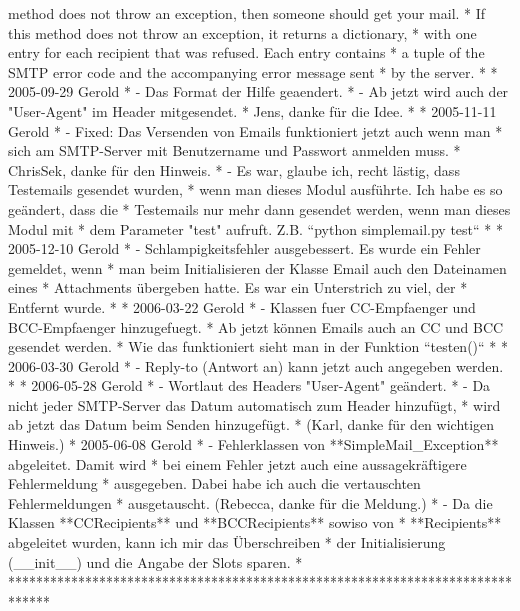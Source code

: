method does not throw an exception, then someone should get your mail. *
If this method does not throw an exception, it returns a dictionary, *     
with one entry for each recipient that was refused. Each entry contains *
a tuple of the SMTP error code and the accompanying error message sent *
by the server. * * 2005-09-29 Gerold *   - Das Format der Hilfe geaendert. 
*   - Ab jetzt wird auch der "User-Agent" im Header mitgesendet. *     
Jens, danke für die Idee. * * 2005-11-11 Gerold *   - Fixed: Das Versenden 
von Emails funktioniert jetzt auch wenn man *     sich am SMTP-Server mit 
Benutzername und Passwort anmelden muss. *     ChrisSek, danke für den 
Hinweis. *   - Es war, glaube ich, recht lästig, dass Testemails gesendet 
wurden, *     wenn man dieses Modul ausführte. Ich habe es so geändert, 
dass die *     Testemails nur mehr dann gesendet werden, wenn man dieses 
Modul mit *     dem Parameter "test" aufruft. Z.B. ``python simplemail.py 
test`` * * 2005-12-10 Gerold *   - Schlampigkeitsfehler ausgebessert. Es 
wurde ein Fehler gemeldet, wenn *     man beim Initialisieren der Klasse 
Email auch den Dateinamen eines *     Attachments übergeben hatte. Es war 
ein Unterstrich zu viel, der *     Entfernt wurde. * * 2006-03-22 Gerold *
- Klassen fuer CC-Empfaenger und BCC-Empfaenger hinzugefuegt. *     Ab 
jetzt können Emails auch an CC und BCC gesendet werden. *     Wie das 
funktioniert sieht man in der Funktion ``testen()`` * * 2006-03-30 Gerold *
- Reply-to (Antwort an) kann jetzt auch angegeben werden. * * 2006-05-28 
Gerold *   - Wortlaut des Headers "User-Agent" geändert. *   - Da nicht 
jeder SMTP-Server das Datum automatisch zum Header hinzufügt, *     wird ab
jetzt das Datum beim Senden hinzugefügt. *     (Karl, danke für den 
wichtigen Hinweis.) * 2005-06-08 Gerold *   - Fehlerklassen von 
**SimpleMail\_Exception** abgeleitet. Damit wird *     bei einem Fehler 
jetzt auch eine aussagekräftigere Fehlermeldung *     ausgegeben. Dabei 
habe ich auch die vertauschten Fehlermeldungen *     ausgetauscht. 
(Rebecca, danke für die Meldung.) *   - Da die Klassen **CCRecipients** und
**BCCRecipients** sowiso von *     **Recipients** abgeleitet wurden, kann 
ich mir das Überschreiben *     der Initialisierung (\_\_init\_\_) und die 
Angabe der Slots sparen. * 
******************************************************************************



